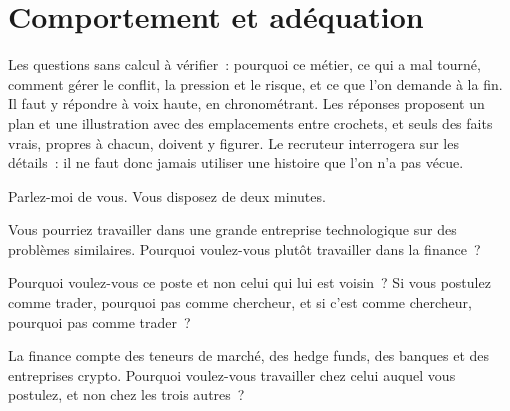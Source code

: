 \chapter{Comportement et adéquation}\label{ch:iv2:behavioural-and-fit}

\begin{ivtrains}
Les questions sans calcul à vérifier~: pourquoi ce métier, ce qui a mal tourné, comment gérer le conflit, la pression et le risque, et ce que l'on demande à la fin. Il faut y répondre à voix haute, en chronométrant. Les réponses proposent un plan et une illustration avec des emplacements entre crochets, et seuls des faits vrais, propres à chacun, doivent y figurer. Le recruteur interrogera sur les détails~: il ne faut donc jamais utiliser une histoire que l'on n'a pas vécue.
\end{ivtrains}

\begin{question}\label{iq:iv2:behavioural-and-fit:1}
Parlez-moi de vous. Vous disposez de deux minutes.
\end{question}

\begin{question}\label{iq:iv2:behavioural-and-fit:2}
Vous pourriez travailler dans une grande entreprise technologique sur des problèmes similaires. Pourquoi voulez-vous plutôt travailler dans la finance~?
\end{question}

\begin{question}\label{iq:iv2:behavioural-and-fit:3}
Pourquoi voulez-vous ce poste et non celui qui lui est voisin~? Si vous postulez comme trader, pourquoi pas comme chercheur, et si c'est comme chercheur, pourquoi pas comme trader~?
\end{question}

\begin{question}\label{iq:iv2:behavioural-and-fit:4}
La finance compte des teneurs de marché, des hedge funds, des banques et des entreprises crypto. Pourquoi voulez-vous travailler chez celui auquel vous postulez, et non chez les trois autres~?
\end{question}

